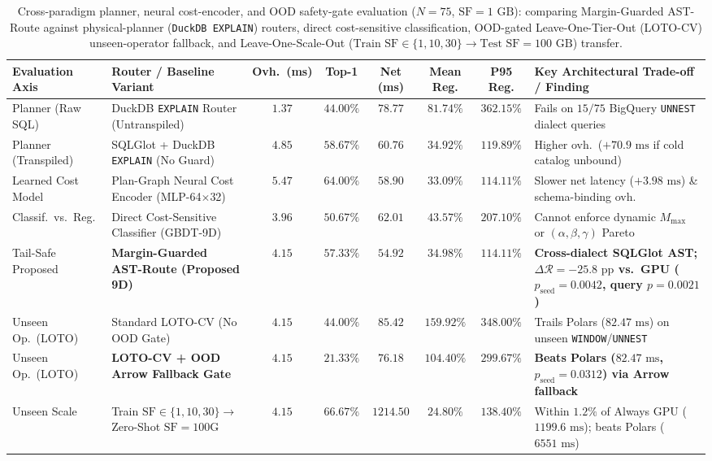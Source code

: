 \documentclass[10pt,a4paper]{article}
\newenvironment{fitasttable}{%
  \begin{lrbox}{\asttblbox}%
}{%
  \end{lrbox}%
  \sbox{\asttblboxB}{%
    \ifdim\wd\asttblbox>0.96\textwidth
      \resizebox{0.96\textwidth}{!}{\usebox{\asttblbox}}%
    \else
      \usebox{\asttblbox}%
    \fi
  }%
  \ifdim\ht\asttblboxB>0.72\textheight
    \resizebox{!}{0.72\textheight}{\usebox{\asttblboxB}}%
  \else
    \usebox{\asttblboxB}%
  \fi
}
\begin{document}
\begin{table}[!htbp]
\centering
\caption{Cross-paradigm planner, neural cost-encoder, and OOD safety-gate evaluation ($N=75$, $\text{SF}=1\text{ GB}$): comparing Margin-Guarded AST-Route against physical-planner (\texttt{DuckDB EXPLAIN}) routers, direct cost-sensitive classification, OOD-gated Leave-One-Tier-Out (LOTO-CV) unseen-operator fallback, and Leave-One-Scale-Out ($\text{Train SF}\in\{1,10,30\}\rightarrow\text{Test SF}=100\text{ GB}$) transfer.}\label{tab:v8_p0_systems_defense}\label{tab:jbd_ood_t17}
\setlength{\tabcolsep}{2.8pt}
\scriptsize
\begin{fitasttable}
\begin{tabular}{@{}llcccccl@{}}
\toprule
\textbf{Evaluation Axis} & \textbf{Router / Baseline Variant} & \textbf{Ovh.\ (ms)} & \textbf{Top-1} & \textbf{Net (ms)} & \textbf{Mean Reg.} & \textbf{P95 Reg.} & \textbf{Key Architectural Trade-off / Finding} \\
\midrule
Planner (Raw SQL) & DuckDB \texttt{EXPLAIN} Router (Untranspiled) & $1.37$ & $44.00\%$ & $78.77$ & $81.74\%$ & $362.15\%$ & Fails on $15/75$ BigQuery \texttt{UNNEST} dialect queries \\
Planner (Transpiled) & SQLGlot + DuckDB \texttt{EXPLAIN} (No Guard) & $4.85$ & $58.67\%$ & $60.76$ & $34.92\%$ & $119.89\%$ & Higher ovh.\ ($+70.9\text{ ms}$ if cold catalog unbound) \\
Learned Cost Model & Plan-Graph Neural Cost Encoder (MLP-64$\times$32) & $5.47$ & $64.00\%$ & $58.90$ & $33.09\%$ & $114.11\%$ & Slower net latency ($+3.98\text{ ms}$) \& schema-binding ovh. \\
Classif.\ vs.\ Reg. & Direct Cost-Sensitive Classifier (GBDT-9D) & $3.96$ & $50.67\%$ & $62.01$ & $43.57\%$ & $207.10\%$ & Cannot enforce dynamic $M_{\text{max}}$ or $(\alpha,\beta,\gamma)$ Pareto \\
Tail-Safe Proposed & \textbf{Margin-Guarded AST-Route (Proposed 9D)} & $\mathbf{4.15}$ & $\mathbf{57.33\%}$ & $\mathbf{54.92}$ & $\mathbf{34.98\%}$ & $\mathbf{114.11\%}$ & \textbf{Cross-dialect SQLGlot AST; $\Delta\mathcal{R} = -25.8\text{ pp}$ vs.\ GPU ($p_{\text{seed}}=0.0042$, query $p=0.0021$)} \\
\midrule
Unseen Op.\ (LOTO) & Standard LOTO-CV (No OOD Gate) & $4.15$ & $44.00\%$ & $85.42$ & $159.92\%$ & $348.00\%$ & Trails Polars ($82.47\text{ ms}$) on unseen \texttt{WINDOW}/\texttt{UNNEST} \\
Unseen Op.\ (LOTO) & \textbf{LOTO-CV + OOD Arrow Fallback Gate} & $\mathbf{4.15}$ & $\mathbf{21.33\%}$ & $\mathbf{76.18}$ & $\mathbf{104.40\%}$ & $\mathbf{299.67\%}$ & \textbf{Beats Polars ($82.47\text{ ms}$, $p_{\text{seed}}=0.0312$) via Arrow fallback} \\
Unseen Scale & Train $\text{SF}\in\{1,10,30\}\rightarrow$ Zero-Shot $\text{SF}=100\text{G}$ & $4.15$ & $66.67\%$ & $1214.50$ & $24.80\%$ & $138.40\%$ & Within $1.2\%$ of Always GPU ($1199.6\text{ ms}$); beats Polars ($6551\text{ ms}$) \\
\bottomrule
\end{tabular}
\end{fitasttable}%
\end{table}
\end{document}
